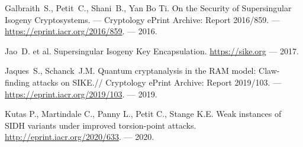 \documentclass[a4paper,12pt]{article}
\theoremstyle{definition}
\begin{document}
\begin{thebibliography}{1}

Galbraith~S., Petit~C.,  Shani~B., Yan Bo Ti.
\newblock
On the Security of Supersingular Isogeny Cryptosystems. --- 
Cryptology ePrint Archive: Report 2016/859. --- \newblock \url{https://eprint.iacr.org/2016/859}. --- 2016.

  

  Jao~D. et al. \newblock Supersingular Isogeny Key Encapsulation. \newblock \url{https://sike.org} --- 2017.


Jaques~S.,  Schanck~J.M.
\newblock Quantum cryptanalysis in the RAM model: Claw-finding attacks on SIKE.//
 Cryptology ePrint Archive: Report 2019/103. ---  \newblock \url{https://eprint.iacr.org/2019/103}. --- 2019.

 
 

 

 Kutas P., Martindale C., Panny L., Petit C.,  Stange K.E. Weak instances of SIDH variants under improved torsion-point attacks. \url{http://eprint.iacr.org/2020/633}. --- 2020.


\end{thebibliography}
\end{document}
